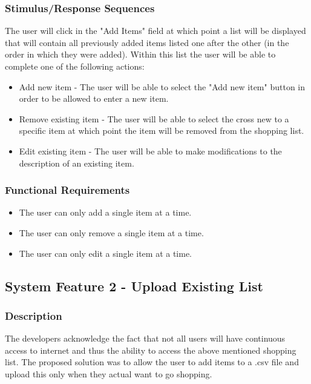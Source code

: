 \documentclass[10pt, a4paper, onecolumn]{scrartcl}
\begin{document}
			\subsubsection{Stimulus/Response Sequences}
			
				The user will click in the "Add Items" field at which point a list will be displayed that will contain all previously added items listed one after the other (in the order in which they were added). Within this list the user will be able to complete one of the following actions:
				
				\begin{itemize}
					\item Add new item - The user will be able to select the "Add new item" button in order to be allowed to enter a new item. 
					\item Remove existing item - The user will be able to select the cross new to a specific item at which point the item will be removed from the shopping list.
					\item Edit existing item - The user will be able to make modifications to the description of an existing item.
				\end{itemize}
			
			\subsubsection{Functional Requirements}
			
				\begin{itemize}
					\item The user can only add a single item at a time.
					\item The user can only remove a single item at a time.
					\item The user can only edit a single item at a time.
				\end{itemize}
			
		
		\subsection{System Feature 2 - Upload Existing List}
			
			\subsubsection{Description}
			
				The developers acknowledge the fact that not all users will have continuous access to internet and thus the ability to access the above mentioned shopping list. The proposed solution was to allow the user to add items to a .csv file and upload this only when they actual want to go shopping. 
				
\end{document}

